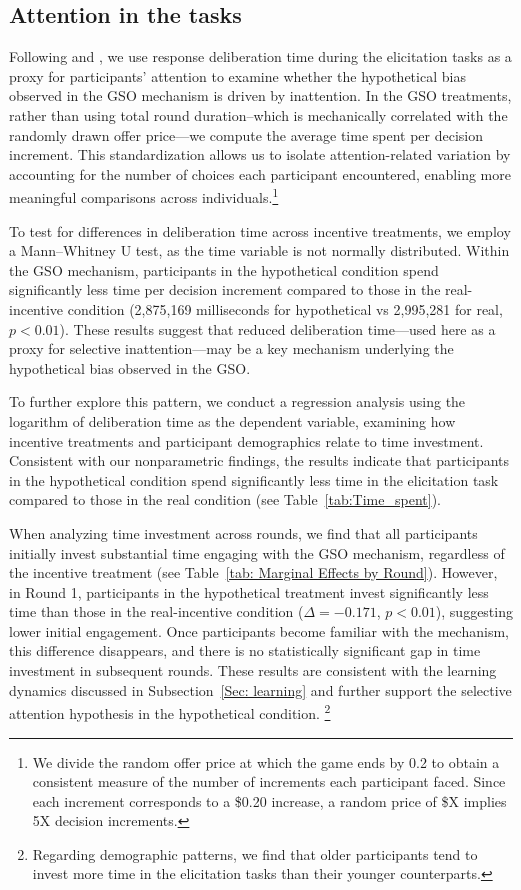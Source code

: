 \documentclass[12pt]{article}
\begin{document}
\subsection{Attention in the tasks}
\label{Sec: Attention}

Following \citet{alos2021cognitive} and \citet{alaoui2016endogenous}, we use response deliberation time during the elicitation tasks as a proxy for participants’ attention to examine whether the hypothetical bias observed in the GSO mechanism is driven by inattention. In the GSO treatments, rather than using total round duration--which is mechanically correlated with the randomly drawn offer price—we compute the average time spent per decision increment. This standardization allows us to isolate attention-related variation by accounting for the number of choices each participant encountered, enabling more meaningful comparisons across individuals.\footnote{We divide the random offer price at which the game ends by 0.2 to obtain a consistent measure of the number of increments each participant faced. Since each increment corresponds to a \$0.20 increase, a random price of \$X implies 5X decision increments.}

To test for differences in deliberation time across incentive treatments, we employ a Mann–Whitney U test, as the time variable is not normally distributed. Within the GSO mechanism, participants in the hypothetical condition spend significantly less time per decision increment compared to those in the real-incentive condition (2,875,169 milliseconds for hypothetical vs 2,995,281 for real, \(p < 0.01\)). 
These results suggest that reduced deliberation time—used here as a proxy for selective inattention—may be a key mechanism underlying the hypothetical bias observed in the GSO.

To further explore this pattern, we conduct a regression analysis using the logarithm of deliberation time as the dependent variable, examining how incentive treatments and participant demographics relate to time investment. Consistent with our nonparametric findings, the results indicate that participants in the hypothetical condition spend significantly less time in the elicitation task compared to those in the real condition (see  Table~\ref{tab:Time_spent}).

When analyzing time investment across rounds, we find that all participants initially invest substantial time engaging with the GSO mechanism, regardless of the incentive treatment (see Table~\ref{tab: Marginal Effects by Round}). However, in Round 1, participants in the hypothetical treatment invest significantly less time than those in the real-incentive condition (\(\Delta = -0.171\), \(p < 0.01\)), suggesting lower initial engagement. Once participants become familiar with the mechanism, this difference disappears, and there is no statistically significant gap in time investment in subsequent rounds. These results are consistent with the learning dynamics discussed in Subsection~\ref{Sec: learning} and further support the selective attention hypothesis in the hypothetical condition.
\footnote{Regarding demographic patterns, we find that older participants tend to invest more time in the elicitation tasks than their younger counterparts.}
\end{document}
